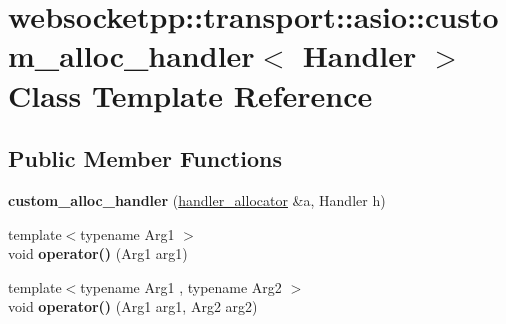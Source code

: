 \hypertarget{classwebsocketpp_1_1transport_1_1asio_1_1custom__alloc__handler}{}\section{websocketpp\+:\+:transport\+:\+:asio\+:\+:custom\+\_\+alloc\+\_\+handler$<$ Handler $>$ Class Template Reference}
\label{classwebsocketpp_1_1transport_1_1asio_1_1custom__alloc__handler}
\subsection*{Public Member Functions}
\begin{DoxyCompactItemize}
\item 
{\bfseries custom\+\_\+alloc\+\_\+handler} (\hyperlink{classwebsocketpp_1_1transport_1_1asio_1_1handler__allocator}{handler\+\_\+allocator} \&a, Handler h)\hypertarget{classwebsocketpp_1_1transport_1_1asio_1_1custom__alloc__handler_ab1006c6d3c3016696dd52d7127ec7a98}{}\label{classwebsocketpp_1_1transport_1_1asio_1_1custom__alloc__handler_ab1006c6d3c3016696dd52d7127ec7a98}

\item 
{\footnotesize template$<$typename Arg1 $>$ }\\void {\bfseries operator()} (Arg1 arg1)\hypertarget{classwebsocketpp_1_1transport_1_1asio_1_1custom__alloc__handler_af90b97d3323ff192385dae0eb29b8d0d}{}\label{classwebsocketpp_1_1transport_1_1asio_1_1custom__alloc__handler_af90b97d3323ff192385dae0eb29b8d0d}

\item 
{\footnotesize template$<$typename Arg1 , typename Arg2 $>$ }\\void {\bfseries operator()} (Arg1 arg1, Arg2 arg2)\hypertarget{classwebsocketpp_1_1transport_1_1asio_1_1custom__alloc__handler_a79f7e6c87d8f40890740ff4c8aa560c5}{}\label{classwebsocketpp_1_1transport_1_1asio_1_1custom__alloc__handler_a79f7e6c87d8f40890740ff4c8aa560c5}

\end{DoxyCompactItemize}

